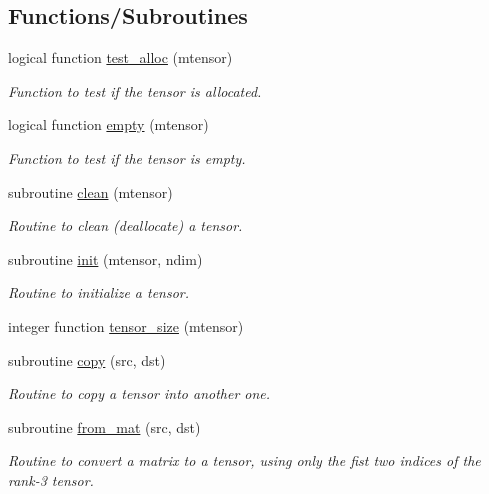 \subsection*{Functions/\+Subroutines}
\begin{DoxyCompactItemize}
\item 
logical function \hyperlink{namespacetensor__def_a165f6b711a4448ec8aa9cee9873fd2f6}{test\+\_\+alloc} (mtensor)
\begin{DoxyCompactList}\small\item\em Function to test if the tensor is allocated. \end{DoxyCompactList}\item 
logical function \hyperlink{namespacetensor__def_aca6b576f087813d386fbffb32e91d8ac}{empty} (mtensor)
\begin{DoxyCompactList}\small\item\em Function to test if the tensor is empty. \end{DoxyCompactList}\item 
subroutine \hyperlink{namespacetensor__def_af79f2660341042dd72c06b26a5343e4a}{clean} (mtensor)
\begin{DoxyCompactList}\small\item\em Routine to clean (deallocate) a tensor. \end{DoxyCompactList}\item 
subroutine \hyperlink{namespacetensor__def_a50a9d9f20c71b946ee184f5cfc84ee1e}{init} (mtensor, ndim)
\begin{DoxyCompactList}\small\item\em Routine to initialize a tensor. \end{DoxyCompactList}\item 
integer function \hyperlink{namespacetensor__def_a3769fac49d59b368e9e5a80767868791}{tensor\+\_\+size} (mtensor)
\item 
subroutine \hyperlink{namespacetensor__def_a87ebfed55ba017fb76695b269c9441c5}{copy} (src, dst)
\begin{DoxyCompactList}\small\item\em Routine to copy a tensor into another one. \end{DoxyCompactList}\item 
subroutine \hyperlink{namespacetensor__def_ac4dacee1ea274a06f049f6133edaaf30}{from\+\_\+mat} (src, dst)
\begin{DoxyCompactList}\small\item\em Routine to convert a matrix to a tensor, using only the fist two indices of the rank-\/3 tensor. \end{DoxyCompactList}\item 

\end{DoxyCompactItemize}
